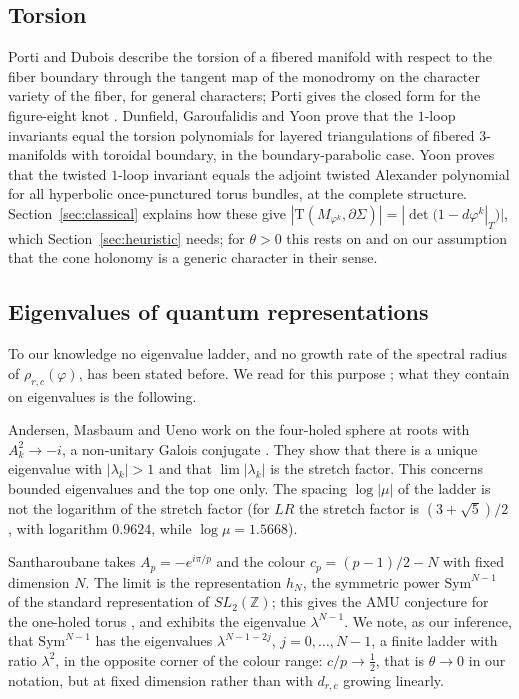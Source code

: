\documentclass[11pt]{amsart}
\theoremstyle{definition}
\theoremstyle{remark}
\newcommand{\Z}{\mathbb{Z}}
\begin{document}
\subsection{Torsion}
Porti \cite[Prop.~5.9]{Porti} and Dubois \cite{Dub} describe the torsion of a
fibered manifold with respect to the fiber boundary through the tangent map of the
monodromy on the character variety of the fiber, for general characters; Porti gives
the closed form for the figure-eight knot \cite[(46)--(50)]{Porti}. Dunfield,
Garoufalidis and Yoon \cite{DGY} prove that the $1$-loop invariants equal the torsion
polynomials for layered triangulations of fibered $3$-manifolds with toroidal
boundary, in the boundary-parabolic case. Yoon \cite{Yoon} proves that the twisted
$1$-loop invariant equals the adjoint twisted Alexander polynomial for all hyperbolic
once-punctured torus bundles, at the complete structure. Section~\ref{sec:classical}
explains how these give $|\mathrm{T}(M_{\varphi^k},\partial\Sigma)| = |\det(1 -
d\varphi^k|_T)|$, which Section~\ref{sec:heuristic} needs; for $\theta > 0$ this rests
on \cite{Porti, Dub} and on our assumption that the cone holonomy is a generic
character in their sense.

\subsection{Eigenvalues of quantum representations}
To our knowledge no eigenvalue ladder, and no growth rate of the spectral radius of
$\rho_{r,c}(\varphi)$, has been stated before. We read for this purpose
\cite{AMU, San, AP, Cha, MP, BCGP, DK, DK2, BDKY}; what they contain on eigenvalues is
the following.

Andersen, Masbaum and Ueno \cite{AMU} work on the four-holed sphere at roots with
$A_k^2 \to -i$, a non-unitary Galois conjugate \cite[Remark~5.2]{AMU}. They show
\cite[Thm.~5.3, Cor.~1.3 and~5.8]{AMU} that there is a unique eigenvalue with
$|\lambda_k| > 1$ and that $\lim|\lambda_k|$ is the stretch factor. This concerns
bounded eigenvalues and the top one only. The spacing $\log|\mu|$ of the ladder is not
the logarithm of the stretch factor (for $LR$ the stretch factor is $(3+\sqrt5)/2$,
with logarithm $0.9624$, while $\log\mu = 1.5668$).

Santharoubane \cite{San} takes $A_p = -e^{i\pi/p}$ and the colour
$c_p = (p-1)/2 - N$ with fixed dimension $N$. The limit is the representation $h_N$,
the symmetric power $\mathrm{Sym}^{N-1}$ of the standard representation of
$SL_2(\Z)$; this gives the AMU conjecture for the one-holed torus \cite[Thm.~2]{San},
and \cite[Section~3.2]{San} exhibits the eigenvalue $\lambda^{N-1}$. We note, as our
inference, that $\mathrm{Sym}^{N-1}$ has the eigenvalues $\lambda^{N-1-2j}$,
$j = 0, \dots, N-1$, a finite ladder with ratio $\lambda^2$, in the opposite corner of
the colour range: $c/p \to \frac12$, that is $\theta \to 0$ in our notation, but at
fixed dimension rather than with $d_{r,c}$ growing linearly.
\end{document}
